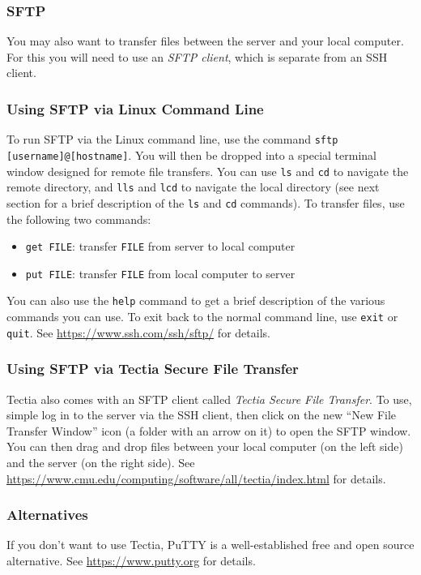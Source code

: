 \documentclass[12pt]{article}
\begin{document}
\subsubsection{SFTP}
You may also want to transfer files between the server and your local computer.
For this you will need to use an \emph{SFTP client}, which is separate from an SSH client.

\subsubsection{Using SFTP via Linux Command Line}
To run SFTP via the Linux command line, use the command \texttt{sftp [username]@[hostname]}.
You will then be dropped into a special terminal window designed for remote file transfers.
You can use \texttt{ls} and \texttt{cd} to navigate the remote directory, and \texttt{lls} and \texttt{lcd} to navigate the local directory (see next section for a brief description of the \texttt{ls} and \texttt{cd} commands).
To transfer files, use the following two commands:
\begin{itemize}
    \item \texttt{get FILE}: transfer \texttt{FILE} from server to local computer
    \item \texttt{put FILE}: transfer \texttt{FILE} from local computer to server
\end{itemize}
You can also use the \texttt{help} command to get a brief description of the various commands you can use.
To exit back to the normal command line, use \texttt{exit} or \texttt{quit}.
See \url{https://www.ssh.com/ssh/sftp/} for details.

\subsubsection{Using SFTP via Tectia Secure File Transfer}
Tectia also comes with an SFTP client called \emph{Tectia Secure File Transfer}.
To use, simple log in to the server via the SSH client, then click on the new ``New File Transfer Window'' icon (a folder with an arrow on it) to open the SFTP window.
You can then drag and drop files between your local computer (on the left side) and the server (on the right side).
See \url{https://www.cmu.edu/computing/software/all/tectia/index.html} for details.

\subsubsection{Alternatives}
If you don't want to use Tectia, PuTTY is a well-established free and open source alternative.
See \url{https://www.putty.org} for details.
\end{document}
